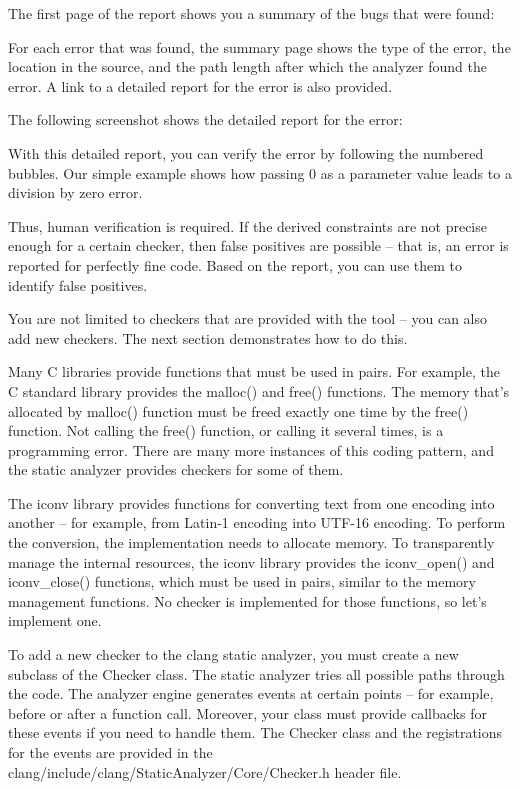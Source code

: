 The first page of the report shows you a summary of the bugs that were found:


For each error that was found, the summary page shows the type of the error, the location in the source, and the path length after which the analyzer found the error. A link to a detailed report for the error is also provided.

The following screenshot shows the detailed report for the error:


With this detailed report, you can verify the error by following the numbered bubbles. Our simple example shows how passing 0 as a parameter value leads to a division by zero error.

Thus, human verification is required. If the derived constraints are not precise enough for a certain checker, then false positives are possible – that is, an error is reported for perfectly fine code. Based on the report, you can use them to identify false positives.

You are not limited to checkers that are provided with the tool – you can also add new checkers. The next section demonstrates how to do this.


Many C libraries provide functions that must be used in pairs. For example, the C standard library provides the malloc() and free() functions. The memory that’s allocated by malloc() function must be freed exactly one time by the free() function. Not calling the free() function, or calling it several times, is a programming error. There are many more instances of this coding pattern, and the static analyzer provides checkers for some of them.

The iconv library provides functions for converting text from one encoding into another – for example, from Latin-1 encoding into UTF-16 encoding. To perform the conversion, the implementation needs to allocate memory. To transparently manage the internal resources, the iconv library provides the iconv\_open() and iconv\_close() functions, which must be used in pairs, similar to the memory management functions. No checker is implemented for those functions, so let’s implement one.

To add a new checker to the clang static analyzer, you must create a new subclass of the Checker class. The static analyzer tries all possible paths through the code. The analyzer engine generates events at certain points – for example, before or after a function call. Moreover, your class must provide callbacks for these events if you need to handle them. The Checker class and the registrations for the events are provided in the clang/include/clang/StaticAnalyzer/Core/Checker.h header file.

